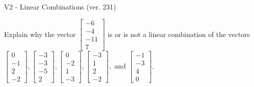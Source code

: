 \begin{exercise}
  \begin{exerciseTitle}V2 - Linear Combinations (ver. 231)\end{exerciseTitle}
  \begin{exerciseStatement}
    Explain why the vector \(\left[\begin{array}{c}
-6 \\
-4 \\
-11 \\
7
\end{array}\right]\)  is or is not a linear 
	combination of the vectors \(\left[\begin{array}{c}
0 \\
-1 \\
2 \\
-2
\end{array}\right] , \left[\begin{array}{c}
-3 \\
-3 \\
-5 \\
2
\end{array}\right] , \left[\begin{array}{c}
0 \\
-2 \\
1 \\
-3
\end{array}\right] , \left[\begin{array}{c}
-3 \\
1 \\
2 \\
-2
\end{array}\right] , \text{ and } \left[\begin{array}{c}
-1 \\
-3 \\
4 \\
0
\end{array}\right]\).
	



\end{exerciseStatement}
\end{exercise}
